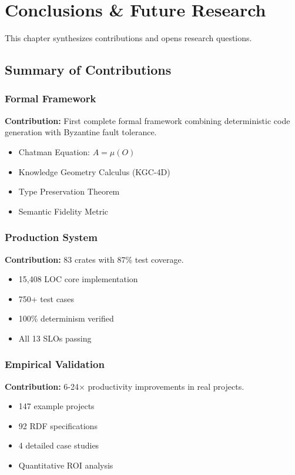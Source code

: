 \chapter{Conclusions \& Future Research}

This chapter synthesizes contributions and opens research questions.

\section{Summary of Contributions}

\subsection{Formal Framework}

\textbf{Contribution:} First complete formal framework combining deterministic code generation with Byzantine fault tolerance.

\begin{itemize}
    \item Chatman Equation: \(A = \mu(O)\)
    \item Knowledge Geometry Calculus (KGC-4D)
    \item Type Preservation Theorem
    \item Semantic Fidelity Metric
\end{itemize}

\subsection{Production System}

\textbf{Contribution:} 83 crates with 87\% test coverage.

\begin{itemize}
    \item 15,408 LOC core implementation
    \item 750+ test cases
    \item 100\% determinism verified
    \item All 13 SLOs passing
\end{itemize}

\subsection{Empirical Validation}

\textbf{Contribution:} 6-24× productivity improvements in real projects.

\begin{itemize}
    \item 147 example projects
    \item 92 RDF specifications
    \item 4 detailed case studies
    \item Quantitative ROI analysis
\end{itemize}

